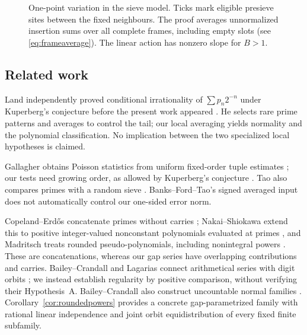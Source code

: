 \documentclass[11pt,a4paper]{article}
\begin{document}
\begin{figure}[t]
\centering
{}
\caption{One-point variation in the sieve model. Ticks mark eligible
presieve sites between the fixed neighbours. The proof averages
unnormalized insertion sums over all complete frames, including empty
slots (see \eqref{eq:frameaverage}). The linear action has nonzero slope
for $B>1$.}
\label{fig:resampling}
\end{figure}

\subsection{Related work}\label{sec:relatedwork}

Land independently proved conditional irrationality of $\sum p_n2^{-n}$
under Kuperberg's conjecture before the present work appeared \cite{land}.
He selects rare prime patterns and averages to control the tail;
our local averaging yields normality and the polynomial classification.
No implication between the two specialized local hypotheses is claimed.

Gallagher obtains Poisson statistics from uniform fixed-order tuple
estimates \cite{gallagher}; our tests need growing order, as allowed by
Kuperberg's conjecture \cite{kuperberg}. Tao also compares primes with
a random sieve \cite{tao2023}. Banks--Ford--Tao's signed averaged input
\cite{bft} does not automatically control our one-sided error norm.

Copeland--Erd\H os concatenate primes without carries \cite{copelanderdoes};
Nakai--Shiokawa extend this to positive integer-valued nonconstant
polynomials evaluated at primes \cite{nakaishiokawa}, and Madritsch
treats rounded pseudo-polynomials, including nonintegral powers
\cite{madritsch2014}. These are concatenations, whereas our gap series
have overlapping contributions and carries.
Bailey--Crandall and Lagarias connect arithmetical series with digit
orbits \cite{baileycrandall,lagarias}; we instead establish regularity
by positive comparison, without verifying their Hypothesis~A.
Bailey--Crandall also construct uncountable normal families
\cite[Theorem~4.12]{baileycrandall}. Corollary~\ref{cor:roundedpowers}
provides a concrete gap-parametrized family with rational linear
independence and joint orbit equidistribution of every fixed finite subfamily.
\end{document}
